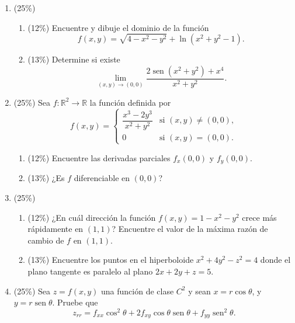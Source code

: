 \documentclass[11pt]{article}
\begin{document}
\begin{enumerate}
\item{} (25\%)
\begin{enumerate}
\item{} (12\%) Encuentre y dibuje el dominio de la función
\[
f(x,y) = \sqrt{4-x^2-y^2}+\ln(x^2+y^2-1).
\]
\item{} (13\%) Determine si existe
\[
\lim_{(x,y)\to(0,0)} \frac{2\operatorname{sen}(x^2+y^2)+x^4}{x^2+y^2}.
\]
\end{enumerate}

\vspace{5cm}

\newpage
\item{} (25\%) Sea $f:\mathbb{R}^2\longrightarrow\mathbb{R}$ la función definida por
\[
f(x,y) = \left\{
\begin{array}{ll}
\dfrac{x^3-2y^3}{x^2+y^2} & \text{si } (x,y)\neq(0,0),\\[6pt]
0 & \text{si } (x,y)=(0,0).
\end{array}
\right.
\]
\begin{enumerate}
\item{} (12\%) Encuentre las derivadas parciales $f_x(0,0)$ y $f_y(0,0)$.
\item{} (13\%) ¿Es $f$ diferenciable en $(0,0)$?
\end{enumerate}

\vspace{6cm}

\newpage
\item{} (25\%)
\begin{enumerate}
\item{} (12\%) ¿En cuál dirección la función $f(x,y)=1-x^2-y^2$ crece más rápidamente en $(1,1)$? Encuentre el valor de la máxima razón de cambio de $f$ en $(1,1)$.
\item{} (13\%) Encuentre los puntos en el hiperboloide $x^2+4y^2-z^2=4$ donde el plano tangente es paralelo al plano $2x+2y+z=5$.
\end{enumerate}

\vspace{6cm}

\newpage
\item{} (25\%) Sea $z=f(x,y)$ una función de clase $C^2$ y sean $x=r\cos\theta$, y $y=r\operatorname{sen}\theta$. Pruebe que
\[
z_{rr} = f_{xx}\cos^2\theta+2f_{xy}\cos\theta\operatorname{sen}\theta+f_{yy}\operatorname{sen}^2\theta.
\]

\vspace{6cm}
\end{enumerate}

\examfooter
\end{document}
